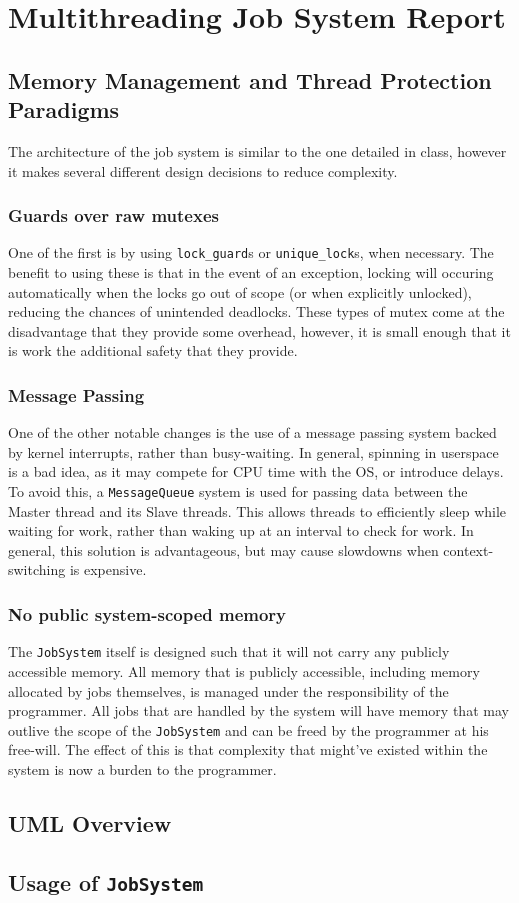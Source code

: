 \documentclass{article}
\begin{document}
\section*{Multithreading Job System Report}
	\subsection{Memory Management and Thread Protection Paradigms}
	The architecture of the job system is similar to the one detailed in class, however it makes several different design decisions to reduce complexity.
		\subsubsection{Guards over raw mutexes}
		One of the first is by using \texttt{lock\_guard}s or \texttt{unique\_lock}s, when necessary. The benefit to using these is that in the event of an exception, locking will occuring automatically when the locks go out of scope (or when explicitly unlocked), reducing the chances of unintended deadlocks. These types of mutex come at the disadvantage that they provide some overhead, however, it is small enough that it is work the additional safety that they provide.
		\subsubsection{Message Passing}
			One of the other notable changes is the use of a message passing system backed by kernel interrupts, rather than busy-waiting. In general, spinning in userspace is a bad idea, as it may compete for CPU time with the OS, or introduce delays. To avoid this, a \texttt{MessageQueue} system is used for passing data between the Master thread and its Slave threads. This allows threads to efficiently sleep while waiting for work, rather than waking up at an interval to check for work. In general, this solution is advantageous, but may cause slowdowns when context-switching is expensive.
		\subsubsection{No public system-scoped memory}
			The \texttt{JobSystem} itself is designed such that it will not carry any publicly accessible memory. All memory that is publicly accessible, including memory allocated by jobs themselves, is managed under the responsibility of the programmer. All jobs that are handled by the system will have memory that may outlive the scope of the \texttt{JobSystem} and can be freed by the programmer at his free-will. The effect of this is that complexity that might've existed within the system is now a burden to the programmer.
	\subsection{UML Overview}
	\subsection{Usage of \texttt{JobSystem}}
\end{document}
